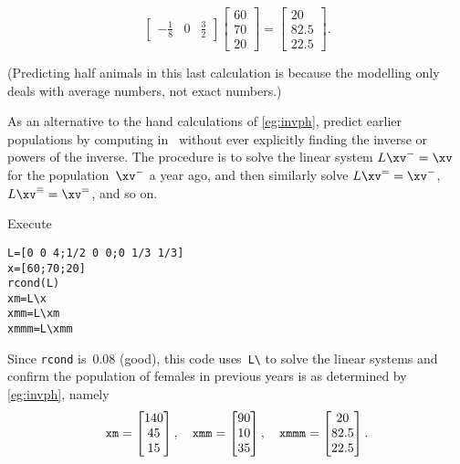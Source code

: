 \begin{example}
\begin{solution}
\begin{itemize}
\begin{equation*}
\begin{bmatrix}
-\frac18&0&\frac32 \end{bmatrix}
\begin{bmatrix} 60\\70\\20 \end{bmatrix}
=\begin{bmatrix} 20\\82.5\\22.5 \end{bmatrix}.
\end{equation*}
\end{itemize}
(Predicting half animals in this last calculation is because the modelling only deals with average numbers, not exact numbers.)
\end{solution}
\end{example}

\begin{example} \label{eg:}
As an alternative to the hand calculations of \autoref{eg:invph}, predict earlier populations by computing in \script\ without ever explicitly finding the inverse or powers of the inverse.
The procedure is to solve the linear system \(L\xv^-=\xv\) for the population~\(\xv^-\) a year ago, and then similarly solve \(L\xv^==\xv^-\), \(L\xv^\equiv=\xv^=\), and so on.
\begin{solution} 
Execute
\setbox\ajrqrbox\hbox{}%
\marginpar{\usebox{\ajrqrbox}}%
\begin{verbatim}
L=[0 0 4;1/2 0 0;0 1/3 1/3]
x=[60;70;20]
rcond(L)
xm=L\x
xmm=L\xm
xmmm=L\xmm
\end{verbatim}
Since \verb|rcond| is~\(0.08\) (good), this code uses~\verb|L\| to solve the linear systems and confirm the population of females in previous years is as determined by \autoref{eg:invph}, namely
\begin{equation*}
\verb|xm|=\begin{bmatrix} 140 \\ 45 \\ 15 \end{bmatrix},\quad
\verb|xmm|=\begin{bmatrix} 90 \\ 10 \\ 35 \end{bmatrix},\quad
\verb|xmmm|=\begin{bmatrix} 20 \\ 82.5 \\ 22.5 \end{bmatrix}.
\end{equation*} 
\end{solution}
\end{example}













